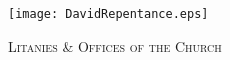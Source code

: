 \fancyhead[RE,LO]{}\fancyhead[RO,LE]{}
\fancyhead[C]{}
\thispagestyle{empty}
{}
  \begin{center}
   \texttt{[image: DavidRepentance.eps]}
   \par
   \vspace{2ex}
   	\textsc{\Huge{Litanies \& Offices of the Church}}
   \end{center}